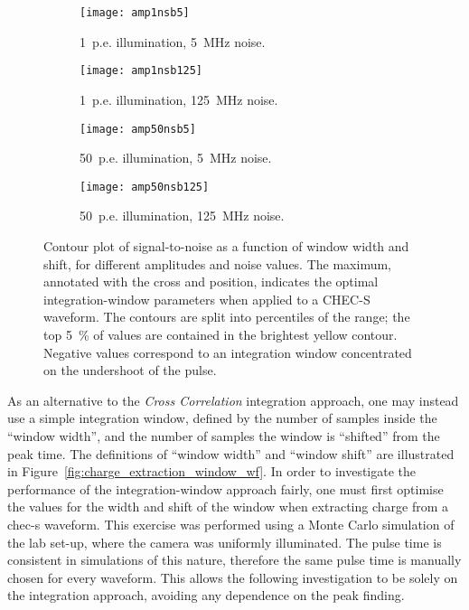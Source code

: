\begin{figure}
  \begin{subfigure}[b]{0.49\textwidth}
    \texttt{[image: amp1nsb5]}
    \caption{1~p.e. illumination, 5~MHz noise.}
    \label{fig:amp1nsb5}
  \end{subfigure}
  \hfill
  \begin{subfigure}[b]{0.49\textwidth}
    \texttt{[image: amp1nsb125]}
    \caption{1~p.e. illumination, 125~MHz noise.}
    \label{fig:amp1nsb125}
  \end{subfigure}
  \hfill
  \begin{subfigure}[b]{0.49\textwidth}
    \texttt{[image: amp50nsb5]}
    \caption{50~p.e. illumination, 5~MHz noise.}
    \label{fig:amp50nsb5}
  \end{subfigure}
  \hfill
  \begin{subfigure}[b]{0.49\textwidth}
    \texttt{[image: amp50nsb125]}
    \caption{50~p.e. illumination, 125~MHz noise.}
    \label{fig:amp50nsb125}
  \end{subfigure}
  \caption[Optimal integration-window parameters.]{Contour plot of signal-to-noise as a function of window width and shift, for different amplitudes and noise values. The maximum, annotated with the cross and position, indicates the optimal integration-window parameters when applied to a CHEC-S waveform. The contours are split into percentiles of the range; the top \SI{5}{\percent} of values are contained in the brightest yellow contour. Negative values correspond to an integration window concentrated on the undershoot of the pulse.}
  \label{fig:snr_noc}
\end{figure}

As an alternative to the \textit{Cross Correlation} integration approach, one may instead use a simple integration window, defined by the number of samples inside the ``window width'', and the number of samples the window is ``shifted'' from the peak time. The definitions of ``window width'' and ``window shift'' are illustrated in Figure~\ref{fig:charge_extraction_window_wf}. In order to investigate the performance of the integration-window approach fairly, one must first optimise the values for the width and shift of the window when extracting charge from a \gls{chec-s} waveform. This exercise was performed using a Monte Carlo simulation of the lab set-up, where the camera was uniformly illuminated. The pulse time is consistent in simulations of this nature, therefore the same pulse time is manually chosen for every waveform. This allows the following investigation to be solely on the integration approach, avoiding any dependence on the peak finding.

